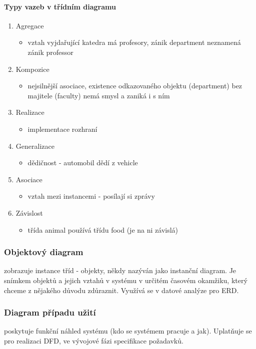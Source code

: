 \documentclass[10pt,a4paper]{article}
\begin{document}
\paragraph{Typy vazeb v třídním diagramu}
\begin{enumerate}
\item Agregace
\begin{itemize}
\item vztah vyjdařující katedra má profesory, zánik department neznamená zánik professor
\end{itemize}
\item Kompozice
\begin{itemize}
\item nejsilnější asociace, existence odkazovaného objektu (department) bez majitele (faculty) nemá smysl a zaniká i s ním
\end{itemize}
\item Realizace
\begin{itemize}
\item implementace rozhraní
\end{itemize}
\item Generalizace
\begin{itemize}
\item dědičnost - automobil dědí z vehicle
\end{itemize}
\item Asociace
\begin{itemize}
\item vztah mezi instancemi - posílají si zprávy
\end{itemize}
\item Závislost
\begin{itemize}
\item třída animal používá třídu food (je na ni závislá)
\end{itemize}
\end{enumerate}
\subsubsection{Objektový diagram}
zobrazuje instance tříd - objekty, někdy nazýván jako instanční diagram.
Je snímkem objektů a jejich vztahů v systému v určitém časovém okamžiku, který chceme z nějakého důvodu zdůraznit. Využívá se v datové analýze pro ERD.
\subsubsection{Diagram případu užití}
poskytuje funkční náhled systému (kdo se systémem pracuje a jak). 
Uplatňuje se pro realizaci DFD, ve vývojové fázi specifikace požadavků.
\end{document}
